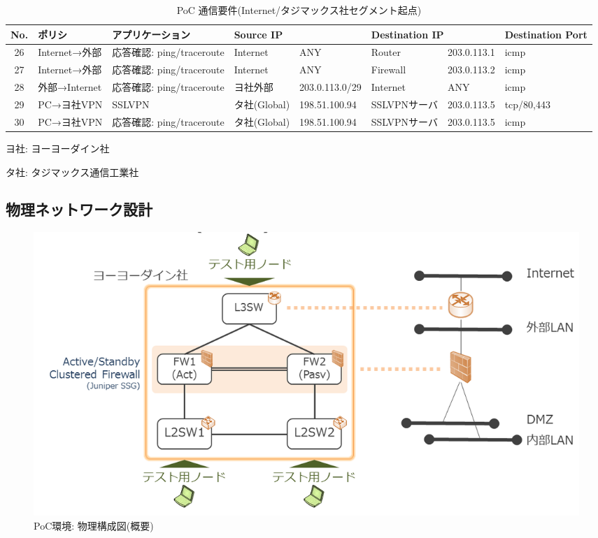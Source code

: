 \begin{landscape}
 \begin{table}[h]
  \centering
  \caption{PoC 通信要件(Internet/タジマックス社セグメント起点)}
  \label{tab:poc-requires-etc}
  \begin{threeparttable}
   \begin{tabularx}{\linewidth}{c|X|X|X|X|X|X|X}
\hline
No. & ポリシ & アプリケーション & \multicolumn{2}{|l|}{Source IP} & \multicolumn{2}{l|}{Destination IP} & Destination Port \\
\hline
\hline
26 & Internet→外部 & 応答確認: ping/traceroute & Internet & ANY & Router & 203.0.113.1 & icmp \\ \hline
27 & Internet→外部 & 応答確認: ping/traceroute & Internet & ANY & Firewall & 203.0.113.2 & icmp \\ \hline
28 & 外部→Internet & 応答確認: ping/traceroute & ヨ社外部 & 203.0.113.0/29 & Internet & ANY & icmp \\ \hline
29 & PC→ヨ社VPN & SSLVPN & タ社(Global) & 198.51.100.94 & SSLVPNサーバ & 203.0.113.5 & tcp/80,443 \\ \hline
30 & PC→ヨ社VPN & 応答確認: ping/traceroute & タ社(Global) & 198.51.100.94 & SSLVPNサーバ & 203.0.113.5 & icmp \\ \hline
   \end{tabularx}
   \begin{tablenotes}
    \footnotesize
    \item ヨ社: ヨーヨーダイン社
    \item タ社: タジマックス通信工業社
   \end{tablenotes}
  \end{threeparttable}
 \end{table}
\end{landscape}

  \subsection{物理ネットワーク設計}

\begin{figure}[h]
 \centering
 \includegraphics[scale=0.55]{img/poc-env-physical.png}
 \caption{PoC環境: 物理構成図(概要)}
 \label{fig:poc-env-physical}
\end{figure}

